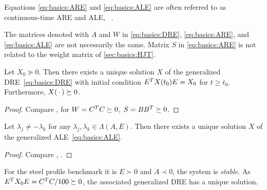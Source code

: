 \begin{remark}
  Equations \eqref{eq:basics:ARE} and \eqref{eq:basics:ALE} are often referred to as
  continuous-time \ac{ARE} and \ac{ALE}, \cf~\cite[Remark~2.11]{Lang2017}.
\end{remark}

\begin{remark}
  The matrices denoted with $A$ and $W$ in \eqref{eq:basics:DRE}, \eqref{eq:basics:ARE}, and \eqref{eq:basics:ALE} are not necessarily the same.
  Matrix $S$ in \eqref{eq:basics:ARE} is not related to the weight matrix of \autoref{sec:basics:HJT}.
\end{remark}

\begin{theorem}
  Let $X_0 \succeq 0$.
  Then there exists a unique solution $X$ of the generalized \ac{DRE}~\eqref{eq:basics:DRE}
  with initial condition $E^T X(t_0) E = X_0$ for $t \geq t_0$.
  Furthermore, $X(\optional{}) \succeq 0$.
\end{theorem}
\begin{proof}
  Compare \cite[Theorem~2.7]{Lang2017}, \cite[Theorem~4.1.6]{Abou2003}
  for $W = C^T C \succeq 0$, $S=BB^T \succeq 0$.
\end{proof}


\begin{theorem}
  Let $\lambda_j \neq -\lambda_k$ for any $\lambda_j, \lambda_k \in\Lambda(A, E)$.
  Then there exists a unique solution $X$ of the generalized \ac{ALE}~\eqref{eq:basics:ALE}.
\end{theorem}
\begin{proof}
  Compare \cite[Theorem~2.10]{Lang2017}, \cite[Corollary~1.1.4]{Abou2003}.
\end{proof}

\begin{example}
  For the steel profile benchmark \cite{morwiki_steel} it is
  $E \succ 0$ and $A \prec 0$, \ie the system is \emph{stable}.
  As $E^T X_0 E = C^T C / 100 \succeq 0$,
  the associated generalized \ac{DRE} has a unique solution.
\end{example}
